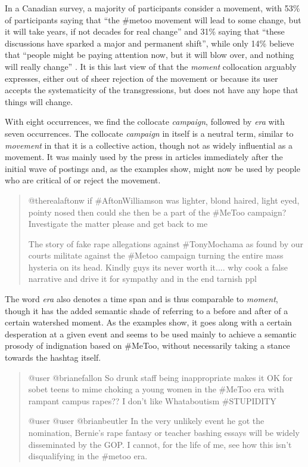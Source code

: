 \documentclass[output=paper,english,spanish,german,english]{langsci/langscibook}
\begin{document}
In a Canadian survey, a majority of participants consider \mt a movement, with 53\% of participants saying that \enquote{the \#metoo movement will lead to some change, but it will take years, if not decades for real change} and 31\% saying that \enquote{these discussions have sparked a major and permanent shift}, while only 14\% believe that \enquote{people might be paying attention now, but it will blow over, and nothing will really change} \parencite{reid18}. It is this last view of \mt that the \textit{moment} collocation arguably expresses, either out of sheer rejection of the movement or because its user accepts the systematicity of the transgressions, but does not have any hope that things will change.

With eight occurrences, we find the collocate \textit{campaign}, followed by \textit{era} with seven occurrences. The collocate \textit{campaign} in itself is a neutral term, similar to \textit{movement} in that it is a collective action, though not as widely influential as a movement. It was mainly used by the press in articles immediately after the initial wave of \mt postings and, as the examples show, might now be used by people who are critical of or reject the movement.

\begin{quote}\sffamily
  @therealaftonw if \#AftonWilliamson was lighter, blond haired, light eyed, pointy nosed then could she then be a part of the \#MeToo campaign? Investigate the matter please and get back to me

  The story of fake rape allegations against \#TonyMochama as found by our courts militate against the \#Metoo campaign turning the entire mass hysteria  on its head. Kindly guys its never worth it.... why cook a false narrative and drive it for sympathy and in the end tarnish ppl
\end{quote}

\noindent The word \textit{era} also denotes a time span and is thus comparable to \textit{moment}, though it has the added semantic shade of referring to a before and after of a certain watershed moment. As the examples show, it goes along with a certain desperation at a given event and seems to be used mainly to achieve a semantic prosody of indignation based on \#MeToo, without necessarily taking a stance towards the hashtag itself.

\begin{quote}\sffamily
  @user @brianefallon So drunk staff being inappropriate makes it OK for sobet teens to mime choking a young women in the \#MeToo era with rampant campus rapes?? I don't like Whataboutism \#STUPIDITY

  @user @user @brianbeutler In the very unlikely event he got the nomination, Bernie’s rape fantasy or teacher bashing essays will be widely disseminated by the GOP. I cannot, for the life of me, see how this isn't disqualifying in the \#metoo era.
\end{quote}
\end{document}
